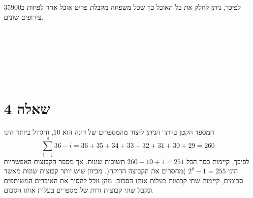 \documentclass[11pt, oneside]{article}
\newcommand{\qed}{\R{$\blacksquare$}}
\newcommand{\br}{\\\\\\\\\\\\\\}
\begin{document}
לפיכך, ניתן לחלק את כל האוכל כך שכל משפחה מקבלת פריט אוכל אחד לפחות ב$35900$ צירופים שונים.
\br\qed


\section{שאלה 4}
המספר הקטן ביותר הניתן ליצור מהמספרים של דינה הוא $10$, והגדול ביותר הינו
\[\sum^8_{i = 1}36-i = 36 + 35 + 34 + 33 + 32 + 31 + 30 + 29 = 260\]
לפיכך, קיימות בסך הכל $260 - 10 + 1 = 251$ תשובות שונות, אך מספר הקבוצות האפשריות הינו $2^8 - 1 = 255$ )מחסרים את הקבוצה הריקה(. מכיוון שיש יותר קבוצות שונות מאשר סכומים, קיימות שתי קבוצות בעלות אותו הסכום. מהן נוכל להסיר את האיברים המשותפים ונקבל שתי קבוצות זרות של מספרים בעלות אותו הסכום.
\br\qed
\end{document}
